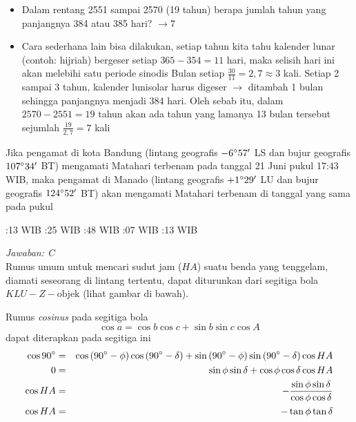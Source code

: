 \documentclass[11pt,fleqn, a4paper]{exam}
\begin{document}
\begin{questions}
\begin{itemize}
\item Dalam rentang 2551 sampai 2570 (19 tahun) berapa jumlah tahun yang panjangnya 384 atau 385 hari? $\rightarrow 7$ \smiley 

\item Cara sederhana lain bisa dilakukan, setiap tahun kita tahu kalender lunar (contoh: hijriah) bergeser setiap $365-354 = 11$ hari, maka selisih hari ini akan melebihi satu periode sinodis Bulan setiap $\frac{30}{11} = 2,7 \approx 3$ kali. Setiap 2 sampai 3 tahun, kalender lunisolar harus digeser $\rightarrow$ ditambah 1 bulan sehingga panjangnya menjadi 384 hari. Oleh sebab itu, dalam $2570-2551 = 19$ tahun akan ada tahun yang lamanya 13 bulan tersebut sejumlah $\frac{19}{2,7} = 7$ kali \smiley
\end{itemize}


\vspace{0.5cm}
\question Jika pengamat di kota Bandung (lintang geografis $-6\degree57'$ LS dan bujur geografis $107\degree34'$ BT) mengamati Matahari terbenam pada tanggal 21 Juni pukul 17:43 WIB, maka pengamat di Manado (lintang geografis $+1\degree29'$ LU dan bujur geografis $124\degree52'$ BT) akan mengamati Matahari terbenam di tanggal yang sama pada pukul
\begin{choices}
:13 WIB
:25 WIB
:48 WIB
:07 WIB
:13 WIB
\end{choices}

\textit{Jawaban: C}\\
Rumus umum untuk mencari sudut jam ($HA$) suatu benda yang tenggelam, diamati seseorang di lintang tertentu, dapat diturunkan dari segitiga bola $KLU - Z - \text{objek}$ (lihat gambar di bawah).

Rumus \textit{cosinus} pada segitiga bola
$$\cos a = \cos b \cos c + \sin b \sin c \cos A$$
dapat diterapkan pada segitiga ini
\begin{eqnarray*}
\cos 90\degree &=& \cos{(90\degree - \phi)} \cos{(90\degree - \delta)} + \sin{(90\degree - \phi)} \sin{(90\degree - \delta)} \cos HA\\
0 &=& \sin{\phi} \sin{\delta} + \cos{\phi}\cos{\delta}\cos{HA}\\
\cos{HA} &=& - \frac{\sin{\phi} \sin{\delta}}{\cos{\phi}\cos{\delta}}\\
\cos{HA} &=& -\tan{\phi} \tan{\delta}
\end{eqnarray*}


\end{questions}
\end{document}
